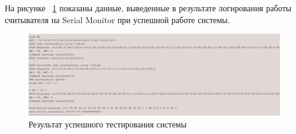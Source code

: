 На рисунке ~\ref{fig:test_success} показаны данные, выведенные в результате логирования работы считывателя на Serial Monitor при успешной работе системы.

\begin{figure}[H]
    \centering
    \includegraphics[width=1\textwidth]{images/design/test_success_white}
    \caption{\centering Результат успешного тестирования системы}
    \label{fig:test_success}
\end{figure}


